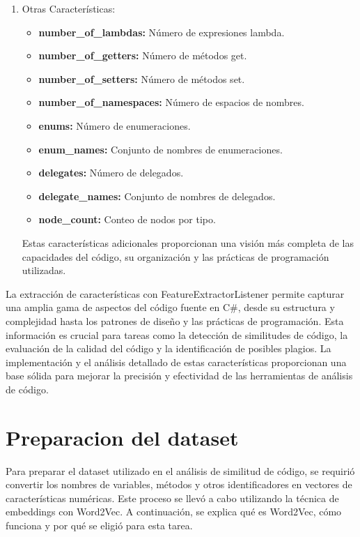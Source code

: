 \begin{enumerate}
    \item Otras Características:
    \begin{itemize}
        \item {\bf number\_of\_lambdas:} Número de expresiones lambda.
        \item {\bf number\_of\_getters:} Número de métodos get.
        \item {\bf number\_of\_setters:} Número de métodos set.
        \item {\bf number\_of\_namespaces:} Número de espacios de nombres.
        \item {\bf enums:} Número de enumeraciones.
        \item {\bf enum\_names:} Conjunto de nombres de enumeraciones.
        \item {\bf delegates:} Número de delegados.
        \item {\bf delegate\_names:} Conjunto de nombres de delegados.
        \item {\bf node\_count:} Conteo de nodos por tipo.
    \end{itemize}
    Estas características adicionales proporcionan una visión más completa de las capacidades del código, su organización y las prácticas de programación utilizadas.

 
\end{enumerate}
    
        
La extracción de características con FeatureExtractorListener permite capturar una amplia gama de aspectos del código fuente en C#, desde su estructura y complejidad hasta los patrones de diseño y las prácticas de programación. Esta información es crucial para tareas como la detección de similitudes de código, la evaluación de la calidad del código y la identificación de posibles plagios. La implementación y el análisis detallado de estas características proporcionan una base sólida para mejorar la precisión y efectividad de las herramientas de análisis de código.

\section{Preparacion del dataset}

Para preparar el dataset utilizado en el análisis de similitud de código, se requirió convertir los nombres de variables, métodos y otros identificadores en vectores de características numéricas. Este proceso se llevó a cabo utilizando la técnica de embeddings con Word2Vec. A continuación, se explica qué es Word2Vec, cómo funciona y por qué se eligió para esta tarea.\\

